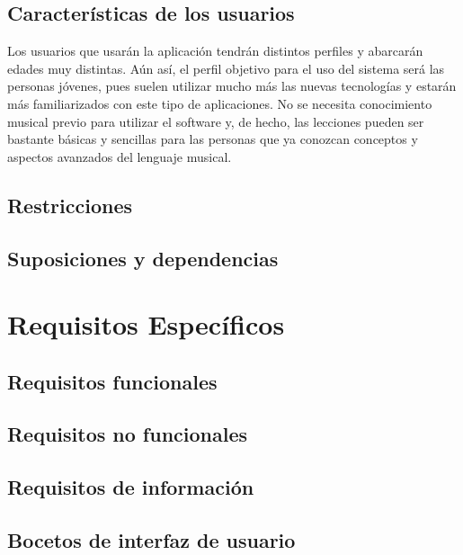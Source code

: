 \subsection{Características de los usuarios}
Los usuarios que usarán la aplicación tendrán distintos perfiles y abarcarán edades muy distintas. Aún así,
el perfil objetivo para el uso del sistema será las personas jóvenes, pues suelen utilizar mucho más las nuevas tecnologías
y estarán más familiarizados con este tipo de aplicaciones. No se necesita conocimiento musical previo para utilizar el software y, 
de hecho, las lecciones pueden ser bastante básicas y sencillas para las personas que ya conozcan conceptos y aspectos avanzados del lenguaje musical.


\subsection{Restricciones}
\subsection{Suposiciones y dependencias}


\section{Requisitos Específicos}
\subsection{Requisitos funcionales}
\subsection{Requisitos no funcionales}
\subsection{Requisitos de información}
\subsection{Bocetos de interfaz de usuario}